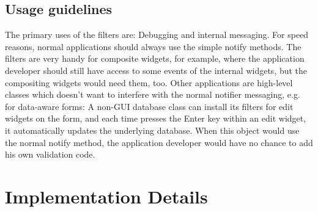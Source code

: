 \subsection{Usage guidelines}
The primary uses of the filters are: Debugging and internal messaging. For speed
reasons, normal applications should always use the simple notify methods. The
filters are very handy for composite widgets, for example, where the application
developer should still have access to some events of the internal widgets, but
the compositing widgets would need them, too. Other applications are high-level
classes which doesn't want to interfere with the normal notifier messaging,
e.g. for data-aware forms: A non-GUI database class can install its filters for
edit widgets on the form, and each time presses the Enter key within an edit
widget, it automatically updates the underlying database. When this object would
use the normal notify method, the application developer would have no chance to
add his own validation code.

\section{Implementation Details}

